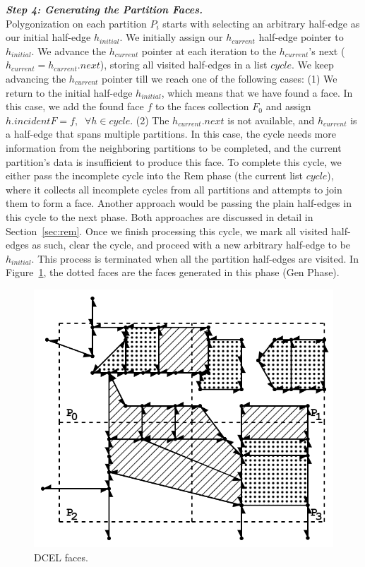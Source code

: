 \vspace{4pt}
\textit{\textbf{Step 4: Generating the Partition Faces.}}
\\
Polygonization on each partition $P_i$ starts with selecting an arbitrary half-edge as our initial half-edge $h_{initial}$.
We initially assign our $h_{current}$ half-edge pointer to $h_{initial}$. We advance the $h_{current}$ pointer at each iteration to the $h_{current}$'s next ($h_{current} = h_{current}.next$), storing all visited half-edges in a list $cycle$. We keep advancing the $h_{current}$ pointer till we reach one of the following cases:
(1) We return to the initial half-edge $h_{initial}$, which means that we have found a face. In this case, we add the found face $f$ to the faces collection $F_0$ and assign $h.incidentF = f, \;\; \forall h \in cycle$.
(2) The $h_{current}.next$ is not available, and $h_{current}$ is a half-edge that spans multiple partitions. In this case, the cycle needs more information from the neighboring partitions to be completed, and the current partition's data is insufficient to produce this face.
To complete this cycle, we either pass the incomplete cycle into the Rem phase (the current list $cycle$), where it collects all incomplete cycles from all partitions and attempts to join them to form a face. Another approach would be passing the plain half-edges in this cycle to the next phase. Both approaches are discussed in detail in Section~\ref{sec:rem}.
Once we finish processing this cycle, we mark all visited half-edges as such, clear the cycle, and proceed with a new arbitrary half-edge to be $h_{initial}$.
This process is terminated when all the partition half-edges are visited.
In Figure~\ref{fig:ddcel:faces}, the dotted faces are the faces generated in this phase (Gen Phase).

\begin{figure}[tb]
	\centering
	\includegraphics[width=0.75 \linewidth ]{model/ddcel-3.png}
	\caption[caption]{DCEL faces.}
	\label{fig:ddcel:faces}
\end{figure}
